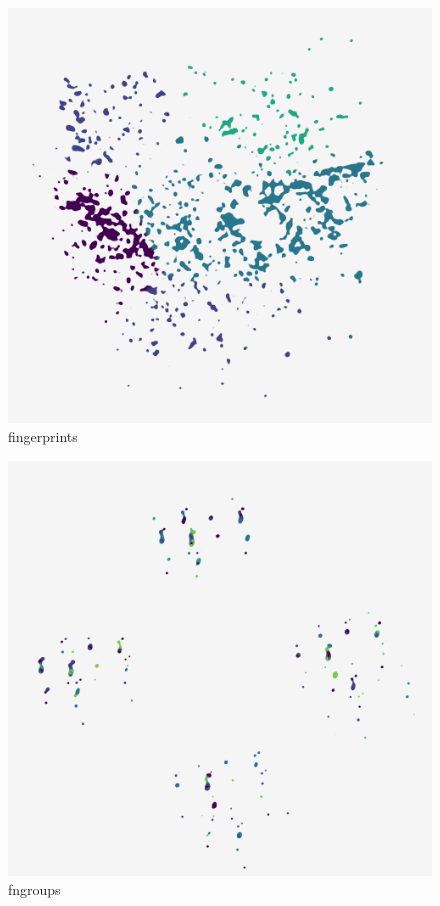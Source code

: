 \begin{subfigure}[b]{.25\linewidth}
    \centering
    \includegraphics[width=\textwidth]{outputs/DRplots/plots/PCA_fingerprints.png}
    \caption{fingerprints}
    \label{fig:PCA_fingerprints}
\end{subfigure}
\begin{subfigure}[b]{.25\linewidth}
    \centering
    \includegraphics[width=\textwidth]{outputs/DRplots/plots/PCA_fngroups.png}
    \caption{fngroups}
    \label{fig:PCA_fngroups}
\end{subfigure}
